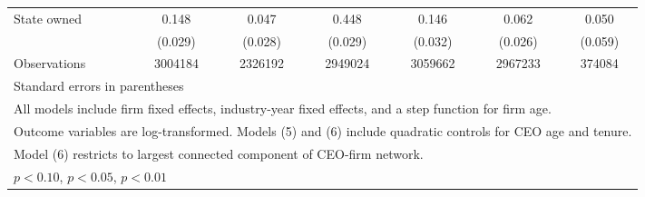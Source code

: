 \begin{table}[htbp]
\begin{tabular}{l*{6}{c}}
\addlinespace
State owned         &       0.148\sym{***}&       0.047\sym{*}  &       0.448\sym{***}&       0.146\sym{***}&       0.062\sym{**} &       0.050         \\
                    &     (0.029)         &     (0.028)         &     (0.029)         &     (0.032)         &     (0.026)         &     (0.059)         \\
\midrule
Observations        &     3004184         &     2326192         &     2949024         &     3059662         &     2967233         &      374084         \\
\bottomrule
\multicolumn{7}{l}{\footnotesize Standard errors in parentheses}\\
\multicolumn{7}{l}{\footnotesize All models include firm fixed effects, industry-year fixed effects, and a step function for firm age.}\\
\multicolumn{7}{l}{\footnotesize Outcome variables are log-transformed. Models (5) and (6) include quadratic controls for CEO age and tenure.}\\
\multicolumn{7}{l}{\footnotesize Model (6) restricts to largest connected component of CEO-firm network.}\\
\multicolumn{7}{l}{\footnotesize \sym{*} \(p<0.10\), \sym{**} \(p<0.05\), \sym{***} \(p<0.01\)}\\
\end{tabular}
\end{table}
